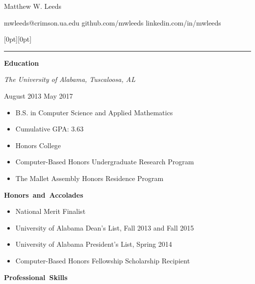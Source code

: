 \documentclass[11pt]{article}
\begin{document}
\centerline{\huge Matthew W. Leeds}
\vspace{0.4em}
\centerline{\normalsize mwleeds@crimson.ua.edu \space \textbar \space github.com/mwleeds \space \textbar \space linkedin.com/in/mwleeds}

\noindent \begin{minipage}[t]{\textwidth}
\raisebox{9pt}[0pt][0pt]{\rule{\textwidth}{0.2mm}\hspace{-\textwidth}}
\end{minipage}

\vspace{0.8em}
\hbox{\large \textbf{Education}}

\begin{minipage}[t]{0.65\textwidth}
\flushleft
\textit{The University of Alabama, Tuscaloosa, AL}\\
\end{minipage}
\begin{minipage}[t]{0.30\textwidth}
\flushright
August 2013 \space \textemdash \space May 2017\\
\end{minipage}

\begin{itemize}
  \item B.S. in Computer Science and Applied Mathematics
  \item Cumulative GPA: 3.63
  \item Honors College
  \item Computer-Based Honors Undergraduate Research Program
  \item The Mallet Assembly Honors Residence Program
\end{itemize}

\vspace{0.8em}
\hbox{\large \textbf{Honors and Accolades}}

\begin{itemize}
  \item National Merit Finalist
  \item University of Alabama Dean's List, Fall 2013 and Fall 2015
  \item University of Alabama President's List, Spring 2014
  \item Computer-Based Honors Fellowship Scholarship Recipient
\end{itemize}

\vspace{0.8em}
\hbox{\large \textbf{Professional Skills}}
\end{document}
